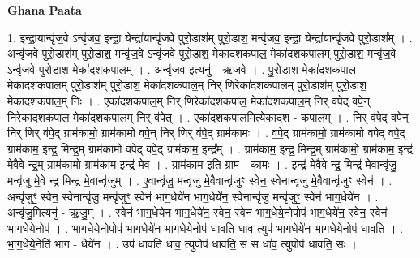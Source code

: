 \documentclass[17pt]{extarticle}
\begin{document}
\textbf{Ghana Paata } \newline

1. इन्द्रा॒यान्वृ॑ज॒वे ऽन्वृ॑जव॒ इन्द्रा॒ येन्द्रा॑यान्वृ॑जवे पुरो॒डाश॑म् पुरो॒डाश॒ मन्वृ॑जव॒ इन्द्रा॒
येन्द्रा॑यान्वृ॑जवे पुरो॒डाश᳚म् । . अन्वृ॑जवे पुरो॒डाश॑म् पुरो॒डाश॒ मन्वृ॑ज॒वे ऽन्वृ॑जवे पुरो॒डाश॒ मेका॑दशकपाल॒ मेका॑दशकपालम् पुरो॒डाश॒ मन्वृ॑ज॒वे ऽन्वृ॑जवे पुरो॒डाश॒ मेका॑दशकपालम् । . अन्वृ॑जव॒ इत्यनु॑ - ऋ॒ज॒वे॒ । . पु॒रो॒डाश॒ मेका॑दशकपाल॒ मेका॑दशकपालम् पुरो॒डाश॑म् पुरो॒डाश॒ मेका॑दशकपाल॒म् निर् णिरेका॑दशकपालम् पुरो॒डाश॑म् पुरो॒डाश॒ मेका॑दशकपाल॒म् निः । . एका॑दशकपाल॒म् निर् णिरेका॑दशकपाल॒ मेका॑दशकपाल॒म् निर् व॑पेद् वपे॒न् निरेका॑दशकपाल॒ मेका॑दशकपाल॒म् निर् व॑पेत् । . एका॑दशकपाल॒मित्येका॑दश - क॒पा॒ल॒म् । . निर् व॑पेद् वपे॒न् निर् णिर् व॑पे॒द् ग्राम॑कामो॒ ग्राम॑कामो वपे॒न् निर् णिर् व॑पे॒द् ग्राम॑कामः । . व॒पे॒द् ग्राम॑कामो॒ ग्राम॑कामो वपेद् वपे॒द् ग्राम॑काम॒ इन्द्र॒ मिन्द्र॒म् ग्राम॑कामो वपेद् वपे॒द् ग्राम॑काम॒ इन्द्र᳚म् । . ग्राम॑काम॒ इन्द्र॒ मिन्द्र॒म् ग्राम॑कामो॒ ग्राम॑काम॒ इन्द्र॑ मे॒वैवे न्द्र॒म् ग्राम॑कामो॒ ग्राम॑काम॒ इन्द्र॑ मे॒व । . ग्राम॑काम॒ इति॒ ग्राम॑ - का॒मः॒ । . इन्द्र॑ मे॒वैवे न्द्र॒ मिन्द्र॑ मे॒वान्वृ॑जु॒ मन्वृ॑जु मे॒वे न्द्र॒ मिन्द्र॑ मे॒वान्वृ॑जुम् । . ए॒वान्वृ॑जु॒ मन्वृ॑जु मे॒वैवान्वृ॑जुꣳ॒॒ स्वेन॒ स्वेनान्वृ॑जु मे॒वैवान्वृ॑जुꣳ॒॒ स्वेन॑ । . अन्वृ॑जुꣳ॒॒ स्वेन॒ स्वेनान्वृ॑जु॒ मन्वृ॑जुꣳ॒॒ स्वेन॑ भाग॒धेये॑न भाग॒धेये॑न॒ स्वेनान्वृ॑जु॒ मन्वृ॑जुꣳ॒॒ स्वेन॑ भाग॒धेये॑न । . अन्वृ॑जु॒मित्यनु॑ - ऋ॒जु॒म् । . स्वेन॑ भाग॒धेये॑न भाग॒धेये॑न॒ स्वेन॒ स्वेन॑ भाग॒धेये॒नोपोप॑ भाग॒धेये॑न॒ स्वेन॒ स्वेन॑ भाग॒धेये॒नोप॑ । . भा॒ग॒धेये॒नोपोप॑ भाग॒धेये॑न भाग॒धेये॒नोप॑ धावति धाव॒ त्युप॑ भाग॒धेये॑न भाग॒धेये॒नोप॑ धावति । . भा॒ग॒धेये॒नेति॑ भाग - धेये॑न । . उप॑ धावति धाव॒ त्युपोप॑ धावति॒ स स धा॑व॒ त्युपोप॑ धावति॒ सः । \newline
\end{document}
